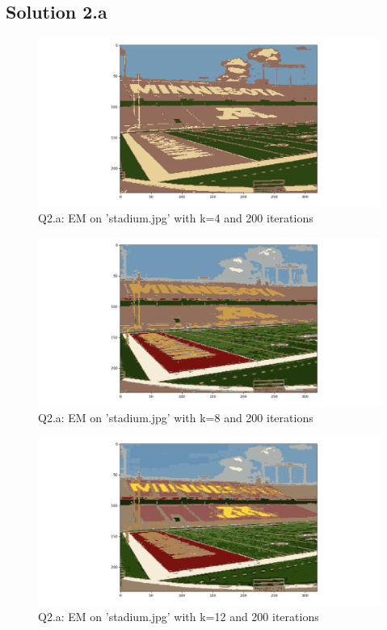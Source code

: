 \subsection*{Solution 2.a}
\begin{figure}[h!]
	\centering
	\includegraphics[scale=0.5]{q2_a_k_4}
	\caption{Q2.a: EM on 'stadium.jpg' with k=4 and 200 iterations}
	\label{fig:2a_em_4}
\end{figure}
\begin{figure}[h!]
	\centering
	\includegraphics[scale=0.5]{q2_a_k_8}
	\caption{Q2.a: EM on 'stadium.jpg' with k=8 and 200 iterations}
	\label{fig:2a_em_8}
\end{figure}
\begin{figure}[h!]
	\centering
	\includegraphics[scale=0.5]{q2_a_k_12}
	\caption{Q2.a: EM on 'stadium.jpg' with k=12 and 200 iterations}
	\label{fig:2a_em_12}
\end{figure}
\newpage
